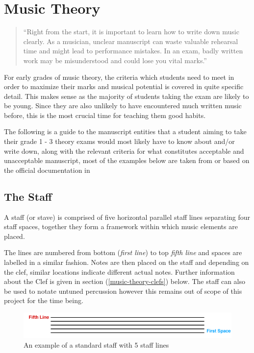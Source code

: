 \section{Music Theory}

\blockquote{``Right from the start, it is important to learn how to write down music clearly. As a musician, unclear manuscript can waste valuable rehearsal time and might lead to performance mistakes. In an exam, badly written work may be misunderstood and could lose you vital marks.'' \parencite{taylor1989ab}}

For early grades of music theory, the criteria which students need to meet in order to maximize their marks and musical potential is covered in quite specific detail. This makes sense as the majority of students taking the exam are likely to be young. Since they are also unlikely to have encountered much written music before, this is the most crucial time for teaching them good habits.

The following is a guide to the manuscript entities that a student aiming to take their grade 1 - 3 theory exams would most likely have to know about and/or write down, along with the relevant criteria for what constitutes acceptable and unacceptable manuscript, most of the examples below are taken from or based on the official documentation in \parencite{taylor2008music}

\subsection{The Staff}
\label{sec:music-theory-staff}
A staff (or stave) is comprised of five horizontal parallel staff lines separating four staff spaces, together they form a framework within which music elements are placed.

The lines are numbered from bottom (\emph{first line}) to top \emph{fifth line} and spaces are labelled in a similar fashion. Notes are then placed on the staff and depending on the clef, similar locations indicate different actual notes. Further information about the Clef is given in section (\cref{music-theory-clefs}) below. The staff can also be used to notate untuned percussion however this remains out of scope of this project for the time being.

\begin{figure}[H]
  \centering
  \includegraphics[width=\linewidth]{gfx/music-theory/staff.png}
  \caption{An example of a standard staff with 5 staff lines}
\end{figure}

